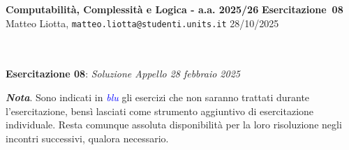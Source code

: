 \documentclass[a4paper,10pt]{article}
\makeatletter
\newcommand{\EsercitazioneNum}{08}
\newcommand{\Data}{28/10/2025}
\newcommand{\DocType}{Esercitazione} %
\newcommand{\FullTitle}{\DocType\ \EsercitazioneNum}
\newcommand{\Header}{
\noindent
  \small \textbf{Computabilità, Complessità e Logica - a.a. 2025/26} \hfill \textbf{\FullTitle} \\[0.2cm]
  \scriptsize Matteo Liotta, \texttt{matteo.liotta@studenti.units.it} \hfill \Data \\[0.2cm]
  \noindent\makebox[\linewidth]{\rule{\linewidth}{0.4pt}} \\[0.3cm]}
\makeatother
\begin{document}
\footnotesize  %
\Header\\[0.7cm]



    
    
    \noindent\Large \textbf{Esercitazione 08}: \textit{Soluzione Appello 28 febbraio 2025}
    \begin{osservazioni}
        \textbf{\textit{Nota}}. Sono indicati in \textcolor{blue}{\textit{blu}} gli esercizi che non saranno trattati durante l'esercitazione, bensì lasciati come strumento aggiuntivo di esercitazione individuale. Resta comunque assoluta disponibilità per la loro risoluzione negli incontri successivi, qualora necessario.
    \end{osservazioni}
    
\end{document}
